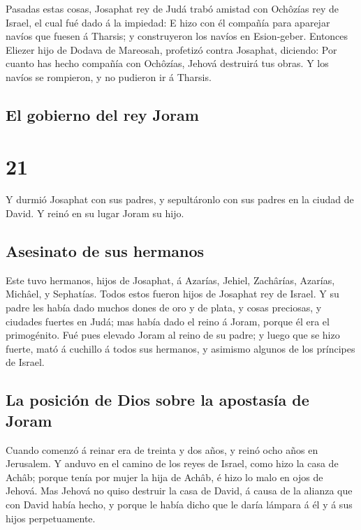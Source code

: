  Pasadas estas cosas, Josaphat rey de Judá trabó amistad
con Ochôzías rey de Israel, el cual fué dado á la impiedad:
 E hizo con él compañía para aparejar navíos que fuesen á
Tharsis; y construyeron los navíos en Esion-geber. 
Entonces Eliezer hijo de Dodava de Mareosah, profetizó contra Josaphat,
diciendo: Por cuanto has hecho compañía con Ochôzías, Jehová destruirá
tus obras. Y los navíos se rompieron, y no pudieron ir á Tharsis.

\hypertarget{el-gobierno-del-rey-joram}{%
\subsection{El gobierno del rey Joram}\label{el-gobierno-del-rey-joram}}

\hypertarget{section-20}{%
\section{21}\label{section-20}}

 Y durmió Josaphat con sus padres, y sepultáronlo con sus
padres en la ciudad de David. Y reinó en su lugar Joram su hijo.

\hypertarget{asesinato-de-sus-hermanos}{%
\subsection{Asesinato de sus hermanos}\label{asesinato-de-sus-hermanos}}

 Este tuvo hermanos, hijos de Josaphat, á Azarías, Jehiel,
Zachârías, Azarías, Michâel, y Sephatías. Todos estos fueron hijos de
Josaphat rey de Israel.  Y su padre les había dado muchos
dones de oro y de plata, y cosas preciosas, y ciudades fuertes en Judá;
mas había dado el reino á Joram, porque él era el primogénito.
 Fué pues elevado Joram al reino de su padre; y luego que se
hizo fuerte, mató á cuchillo á todos sus hermanos, y asimismo algunos de
los príncipes de Israel.

\hypertarget{la-posiciuxf3n-de-dios-sobre-la-apostasuxeda-de-joram}{%
\subsection{La posición de Dios sobre la apostasía de
Joram}\label{la-posiciuxf3n-de-dios-sobre-la-apostasuxeda-de-joram}}

 Cuando comenzó á reinar era de treinta y dos años, y reinó
ocho años en Jerusalem.  Y anduvo en el camino de los reyes
de Israel, como hizo la casa de Achâb; porque tenía por mujer la hija de
Achâb, é hizo lo malo en ojos de Jehová.  Mas Jehová no
quiso destruir la casa de David, á causa de la alianza que con David
había hecho, y porque le había dicho que le daría lámpara á él y á sus
hijos perpetuamente.


